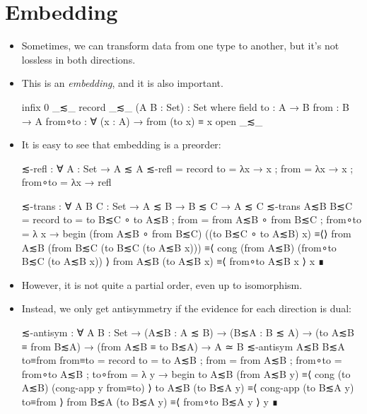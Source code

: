 \documentclass{lecturenotes}
\begin{document}
\newpage
\section{Embedding}
\label{sec:embedding}

\begin{itemize}
\item Sometimes, we can transform data from one type to another, but it's not lossless in both directions.
\item This is an \emph{embedding}, and it is also important.
\begin{code}
infix 0 _≲_
record _≲_ (A B : Set) : Set where
  field
    to      : A → B
    from    : B → A
    from∘to : ∀ (x : A) → from (to x) ≡ x
open _≲_
\end{code}
\item It is easy to see that embedding is a preorder:
\begin{code}
≲-refl : ∀ {A : Set} → A ≲ A
≲-refl =
  record
  {
    to = λ{x → x}
  ; from = λ{x → x}
  ; from∘to = λ{x → refl}
  }

≲-trans : ∀ {A B C : Set} → A ≲ B → B ≲ C → A ≲ C
≲-trans A≲B B≲C =
  record
  {
    to      = to B≲C ∘ to A≲B
  ; from    = from A≲B ∘ from B≲C
  ; from∘to = λ {x →
    begin
      (from A≲B ∘ from B≲C) ((to B≲C ∘ to A≲B) x)
    ≡⟨⟩
      from A≲B (from B≲C (to B≲C (to A≲B x)))
    ≡⟨ cong (from A≲B) (from∘to B≲C (to A≲B x)) ⟩
      from A≲B (to A≲B x)
    ≡⟨ from∘to A≲B x ⟩
      x
    ∎}
  }
\end{code}
\item However, it is not quite a partial order, even up to isomorphism.
  \newpage
\item Instead, we only get antisymmetry if the evidence for each direction is dual:
\begin{code}
≲-antisym : ∀ {A B : Set} →
  (A≲B : A ≲ B) →
  (B≲A : B ≲ A) →
  (to A≲B ≡ from B≲A) →
  (from A≲B ≡ to B≲A) →
  A ≃ B
≲-antisym A≲B B≲A to≡from from≡to =
  record
  {
    to      = to A≲B
  ; from    = from A≲B
  ; from∘to = from∘to A≲B
  ; to∘from = λ {y →
     begin
       to A≲B (from A≲B y)
     ≡⟨ cong (to A≲B) (cong-app y from≡to) ⟩
       to A≲B (to B≲A y)
     ≡⟨ cong-app (to B≲A y) to≡from ⟩
       from B≲A (to B≲A y)
     ≡⟨ from∘to B≲A y ⟩
       y
     ∎}
  }
\end{code}
\end{itemize}
\end{document}
